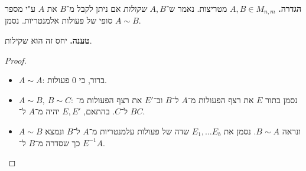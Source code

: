 \documentclass[]{article}
\newcommand\op    {^{-1}}
\begin{document}
 \textbf{הגדרה. }$A, B \in M_{n, m}$ מטריצות. נאמר ש־$A, B$ \textit{שקולות} אם ניתן לקבל מ־$B$ את $A$ ע"י מספר סופי של פעולות אלמנטריות. נסמן $A \sim B$. 
 
 \textbf{טענה. }יחס זה הוא שקילות. 
\begin{proof}
	\begin{itemize}
		\item $A \sim A$: ברור, כי 0 פעולות. 
		\item $A \sim B, \ B \sim C$: נסמן בתור $E$ את רצף הפעולות מ־$A$ ל־$B$ וב־$E'$ את רצף הפעולות מ־$B$ ל־$C$. בהתאם, $E, E'$ יהיה מ־$A$ ל־$C$. 
		\item $A \sim B$ ונראה $B \sim A$. נסמן את $E_1, \dots E_b$ שדה של פעולות עלמנטריות מ־$A$ ל־$B$ ונמצא $E\op$ כך שסדרה מ־$B$ ל־$A$. 
	\end{itemize}
\end{proof}

	
\end{document}
